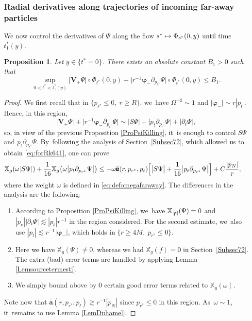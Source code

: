 \documentclass[JEP,XML,SOM,Unicode,published]{cedram}
\newcommand\mto{\mathchoice{\longmapsto}{\mapsto}{\mapsto}{\mapsto}}
\theoremstyle{plain}
\newtheorem{proposition}{Proposition}[section]
\theoremstyle{definition}
\newcommand\T{{\mathbb{X}}}
\begin{document}
\subsubsection{Radial derivatives along trajectories of incoming far-away particles}

We now control the derivatives of $\Psi$ along the flow $s^* \mto \Phi_{s^*} (0,y)$ until time $t^*_1(y)$.
\begin{proposition}\label{ProfarawayincoPsi}
Let $y \in \{ t^*=0 \}$. There exists an absolute constant $B_1>0$ such that
\[
\sup_{0 < t^* < t^*_1(y)} \big| \pmb{V}_{\! +}\Psi \big|\circ \Phi_{t^*}(0,y)+\big|r^{-1} \pmb{\varphi}_- \partial_{p_{r^*}} \Psi \big|\circ \Phi_{t^*}(0,y) \leq B_1.
\]
\end{proposition}

\begin{proof}
We first recall that in $\{ p_{r^*} \leq 0, \; r \geq R \}$, we~have $\Omega^{-2} \sim 1$ and $|\pmb{\varphi}_-| \sim r|p_t|$. Hence, in this region,
\[
\big| \pmb{V}_{\! +} \Psi \big| +\big|r^{-1} \pmb{\varphi}_- \partial_{p_{r^*}} \Psi \big| \sim \big| S \Psi \big| +\big|p_t \partial_{p_{r^*}} \Psi \big|+\big|\partial_t \Psi \big|,
\]
so, in view of the previous Proposition \ref{ProPsiKilling}, it~is enough to control $S \Psi$ and $p_t \partial_{p_{r^*}} \Psi$. By~following the analysis of Section~\ref{Subsec72}, which allowed us to obtain \eqref{eq:forRk641}, one can prove
\begin{align} \nonumber
& \T_g(\omega | S \Psi|)+ \frac{1}{16}\T_g \bigl(\omega \big|p_t \partial_{p_{r^*}} \Psi \big| \bigr) \leq -\omega \overline{\pmb{a}}(r,p_{r^*},p_t) \Bigl[\big|S \Psi \big| + \frac{1}{16}\big|p_t \partial_{p_{r^*}} \Psi \big| \Bigr]+C\frac{|p_N|}{r},
\end{align}
where the weight $\omega$ is defined in \eqref{eq:defomegafaraway}. The differences in the analysis are the following:
\begin{enumerate}
\item According to Proposition \ref{ProPsiKilling}, we~have $\T_{|\slashed{p}|}(\Psi)=0$ and $|p_v||\partial_t \Psi| \lesssim |p_t|r^{-1}$ in the region considered. For the second estimate, we~also use $|p_t| \lesssim r^{-1}|\pmb{\varphi}_-|$, which holds in $\{r \geq 4M, \; p_{r^*} \leq 0 \}$.
\item Here we have $\T_g(\Psi) \neq 0$, whereas we had $\T_g(f) =0$ in Section~\ref{Subsec72}. The extra (bad) error terms are handled by applying Lemma \ref{Lemsourcetermesti}.
\item We simply bound above by $0$ certain good error terms related to $\T_g(\omega)$.
\end{enumerate}
Note now that $\overline{\pmb{a}}(r,p_{r^*},p_t)\! \gtrsim r^{-1}|p_N|$ since $p_{r^*}\! \leq 0$ in this region. As~$\omega \sim 1$, it~remains to use Lemma \ref{LemDuhamel}.
\end{proof}
\end{document}
